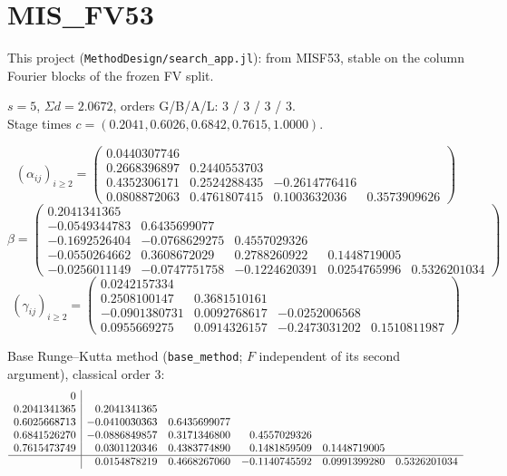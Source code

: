 \documentclass[11pt,a4paper]{article}
\begin{document}
\section{MIS\_FV53}
This project (\texttt{MethodDesign/search\_app.jl}): from MISF53, stable on the column Fourier blocks of the frozen FV split.

\noindent $s=5$, $\Sigma d=2.0672$, orders G/B/A/L: 3 / 3 / 3 / 3.\\ Stage times $c=(0.2041, 0.6026, 0.6842, 0.7615, 1.0000)$.

{\footnotesize\[(\alpha_{ij})_{i\ge2}=\left(\begin{array}{rrrr}0.0440307746 &  &  & \\
0.2668396897 & 0.2440553703 &  & \\
0.4352306171 & 0.2524288435 & -0.2614776416 & \\
0.0808872063 & 0.4761807415 & 0.1003632036 & 0.3573909626\end{array}\right)\]
\[\beta=\left(\begin{array}{rrrrr}0.2041341365 &  &  &  & \\
-0.0549344783 & 0.6435699077 &  &  & \\
-0.1692526404 & -0.0768629275 & 0.4557029326 &  & \\
-0.0550264662 & 0.3608672029 & 0.2788260922 & 0.1448719005 & \\
-0.0256011149 & -0.0747751758 & -0.1224620391 & 0.0254765996 & 0.5326201034\end{array}\right)\]
\[(\gamma_{ij})_{i\ge2}=\left(\begin{array}{rrrr}0.0242157334 &  &  & \\
0.2508100147 & 0.3681510161 &  & \\
-0.0901380731 & 0.0092768617 & -0.0252006568 & \\
0.0955669275 & 0.0914326157 & -0.2473031202 & 0.1510811987\end{array}\right)\]}

\noindent Base Runge--Kutta method (\texttt{base\_method}; $F$ independent of its second argument), classical order 3:
{\footnotesize\[\begin{array}{r|rrrrr}0 &  &  &  &  & \\
0.2041341365 & 0.2041341365 &  &  &  & \\
0.6025668713 & -0.0410030363 & 0.6435699077 &  &  & \\
0.6841526270 & -0.0886849857 & 0.3171346800 & 0.4557029326 &  & \\
0.7615473749 & 0.0301120346 & 0.4383774890 & 0.1481859509 & 0.1448719005 & \\\hline
 & 0.0154878219 & 0.4668267060 & -0.1140745592 & 0.0991399280 & 0.5326201034\end{array}\]}
\end{document}
